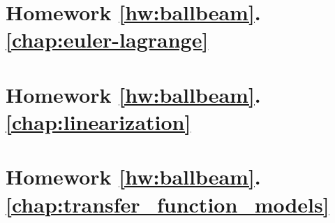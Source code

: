 	\section*{
		Homework \ref{hw:ballbeam}.\ref{chap:euler-lagrange}}  \label{hw:ballbeam_equations_of_motion}
		
%		
	\section*{
		Homework \ref{hw:ballbeam}.\ref{chap:linearization}}  \label{hw:ballbeam_linearization}
		
	\section*{
		Homework \ref{hw:ballbeam}.\ref{chap:transfer_function_models}}  \label{hw:ballbeam_transfer_function}
		

